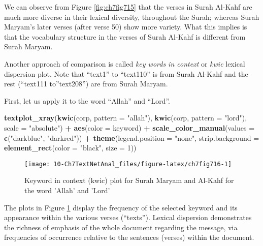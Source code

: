 \documentclass[
]{article}
\newenvironment{Shaded}{\begin{snugshade}}{\end{snugshade}}
\newcommand{\AttributeTok}[1]{\textcolor[rgb]{0.13,0.29,0.53}{#1}}
\newcommand{\DecValTok}[1]{\textcolor[rgb]{0.00,0.00,0.81}{#1}}
\newcommand{\FunctionTok}[1]{\textcolor[rgb]{0.13,0.29,0.53}{\textbf{#1}}}
\newcommand{\NormalTok}[1]{#1}
\newcommand{\SpecialCharTok}[1]{\textcolor[rgb]{0.81,0.36,0.00}{\textbf{#1}}}
\newcommand{\StringTok}[1]{\textcolor[rgb]{0.31,0.60,0.02}{#1}}
\begin{document}
We can observe from Figure \ref{fig:ch7fig715} that the verses in Surah Al-Kahf are much more diverse in their lexical diversity, throughout the Surah; whereas Surah Maryam's later verses (after verse 50) show more variety. What this implies is that the vocabulary structure in the verses of Surah Al-Kahf is different from Surah Maryam.

Another approach of comparison is called \emph{key words in context} or \emph{kwic} lexical dispersion plot. Note that ``text1'' to ``text110'' is from Surah Al-Kahf and the rest (``text111 to''text208'') are from Surah Maryam.

First, let us apply it to the word ``Allah'' and ``Lord''.

\begin{Shaded}
\begin{Highlighting}[]
\FunctionTok{textplot\_xray}\NormalTok{(}\FunctionTok{kwic}\NormalTok{(corp, }\AttributeTok{pattern =} \StringTok{"allah"}\NormalTok{), }\FunctionTok{kwic}\NormalTok{(corp, }\AttributeTok{pattern =} \StringTok{"lord"}\NormalTok{),}
              \AttributeTok{scale =} \StringTok{"absolute"}\NormalTok{) }\SpecialCharTok{+}
              \FunctionTok{aes}\NormalTok{(}\AttributeTok{color =}\NormalTok{ keyword) }\SpecialCharTok{+} 
              \FunctionTok{scale\_color\_manual}\NormalTok{(}\AttributeTok{values =} \FunctionTok{c}\NormalTok{(}\StringTok{"darkblue"}\NormalTok{, }\StringTok{"darkred"}\NormalTok{)) }\SpecialCharTok{+}
              \FunctionTok{theme}\NormalTok{(}\AttributeTok{legend.position =} \StringTok{"none"}\NormalTok{,}
                    \AttributeTok{strip.background =} \FunctionTok{element\_rect}\NormalTok{(}\AttributeTok{color =} \StringTok{"black"}\NormalTok{, }\AttributeTok{size =} \DecValTok{1}\NormalTok{))}
\end{Highlighting}
\end{Shaded}

\begin{figure}

{\centering \texttt{[image: 10-Ch7TextNetAnal\_files/figure-latex/ch7fig716-1]} 

}

\caption{Keyword in context (kwic) plot for Surah Maryam and Al-Kahf for the word 'Allah' and 'Lord'}\label{fig:ch7fig716}
\end{figure}

The plots in Figure \ref{fig:ch7fig716} display the frequency of the selected keyword and its appearance within the various verses (``texts''). Lexical dispersion demonstrates the richness of emphasis of the whole document regarding the message, via frequencies of occurrence relative to the sentences (verses) within the document.
\end{document}
